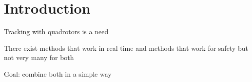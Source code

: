 \section{Introduction}
Tracking with quadrotors is a need

There exist methods that work in real time and methods that work for safety but not very many for both

Goal: combine both in a simple way
